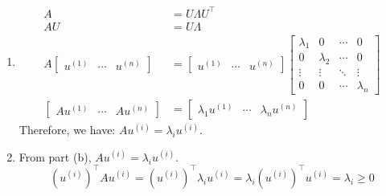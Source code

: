 \begin{enumerate}
    \item \begin{answer}
        \begin{align*}
            A &= U\Lambda U^{\top} \\
            AU &= U\Lambda \\
            A \begin{bmatrix}
                u^{(1)} & \cdots & u^{(n)}
            \end{bmatrix} &= 
            \begin{bmatrix}
                u^{(1)} & \cdots & u^{(n)}
            \end{bmatrix}
            \begin{bmatrix}
                \lambda_1 & 0 & \cdots & 0 \\
                0 & \lambda_2 & \cdots & 0 \\
                \vdots & \vdots & \ddots & \vdots \\
                0 & 0 & \cdots & \lambda_n
            \end{bmatrix} \\
            \begin{bmatrix}
                Au^{(1)} & \cdots & Au^{(n)}
            \end{bmatrix} &= 
            \begin{bmatrix}
                \lambda_1 u^{(1)} & \cdots & \lambda_n u^{(n)}
            \end{bmatrix}
        \end{align*}
        Therefore, we have: $Au^{(i)} = \lambda_i u^{(i)}$.
    \end{answer}

    \item \begin{answer}
        From part (b), $Au^{(i)} = \lambda_i u^{(i)}$.
        $$(u^{(i)})^{\top}Au^{(i)} = (u^{(i)})^{\top}\lambda_i u^{(i)} = \lambda_i (u^{(i)})^{\top} u^{(i)} = \lambda_i \ge 0$$
    \end{answer}
\end{enumerate}